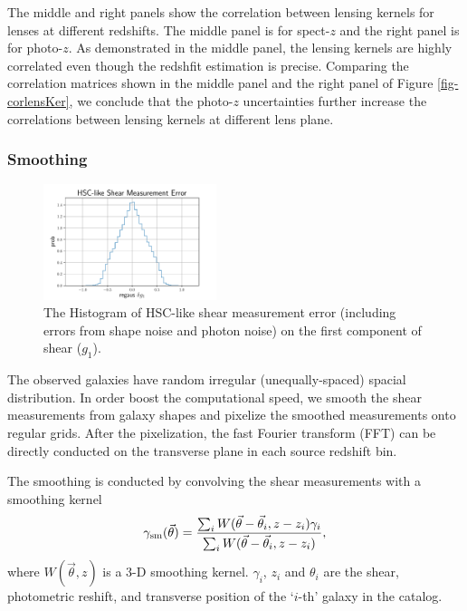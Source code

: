 \documentclass[twocolumn]{aastex62}
\begin{document}
The middle and right panels show the correlation between lensing kernels for lenses at different redshifts. The middle panel is for 
spect-$z$ and the right panel is for photo-$z$.
As demonstrated in the middle panel, the lensing kernels are highly correlated even though the redshfit estimation is precise.
Comparing the correlation matrices shown in the middle panel and the right panel of Figure \ref{fig-corlensKer}, we conclude 
that the photo-$z$ uncertainties further increase the correlations between lensing kernels at different lens plane.

\subsubsection{Smoothing}
\label{subsec:method-smoothing}

\begin{figure}[!t]
 \centering
 \includegraphics[width=0.45\textwidth]{shapeMeasurementError-HSCY1.pdf}
 \caption{The Histogram of HSC-like shear measurement error (including errors from shape noise and photon noise) on the 
        first component of shear ($g_1$).}
 \label{fig:mass-redshift}
\end{figure}

The observed galaxies have random irregular (unequally-spaced) spacial distribution. In order boost the computational
speed, we smooth the shear measurements from galaxy shapes and pixelize the smoothed measurements onto regular grids.
After the pixelization, the fast Fourier transform (FFT) can be directly conducted on the transverse plane in each 
source redshift bin.

The smoothing is conducted by convolving the shear measurements with a smoothing kernel
\begin{equation}
\gamma_{\rm{sm}} (\vec{\theta})  = \frac{\sum_i  W(\vec{\theta}-\vec{{\theta}}_i,z-z_i) \gamma_i}{\sum_i W(\vec{\theta}-\vec{{\theta}}_i,z-z_i) },
\end{equation}
where $W(\vec{\theta},z)$ is a $3$-D smoothing kernel. $\gamma_i$, $z_i$ and $\theta_i$ are the shear,
photometric reshift, and transverse position of the `$i$-th' galaxy in the catalog.
\end{document}
